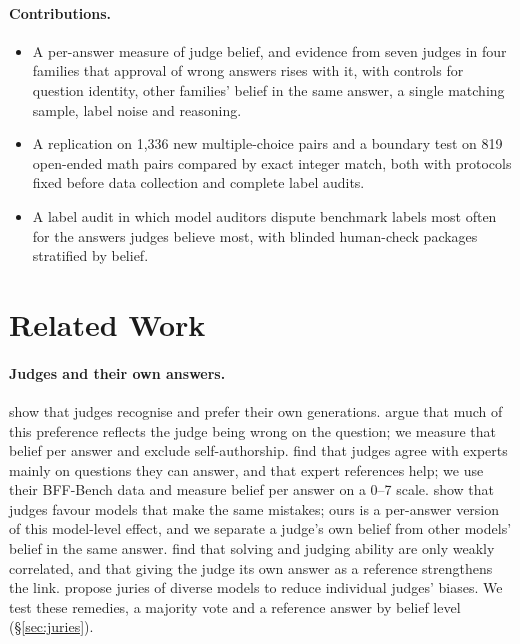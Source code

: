 \documentclass[11pt]{article}
\begin{document}
\paragraph{Contributions.}
\begin{itemize}
\item A per-answer measure of judge belief, and evidence from seven judges in four families that approval of wrong
answers rises with it, with controls for question identity, other families' belief in the same answer, a single
matching sample, label noise and reasoning.
\item A replication on 1,336 new multiple-choice pairs and a boundary test on 819 open-ended math pairs compared by
exact integer match, both with protocols fixed before data collection and complete label audits.
\item A label audit in which model auditors dispute benchmark labels most often for the answers judges believe
most, with blinded human-check packages stratified by belief.
\end{itemize}

\section{Related Work}

\paragraph{Judges and their own answers.}
\citet{panickssery2024llm} show that judges recognise and prefer their own generations.
\citet{roytburg2026narcissists} argue that much of this preference reflects the judge being wrong on the question;
we measure that belief per answer and exclude self-authorship. \citet{krumdick2026nofreelabels} find that judges
agree with experts mainly on questions they can answer, and that expert references help; we use their BFF-Bench data
and measure belief per answer on a 0--7 scale. \citet{goel2025great} show that judges favour models that make the same
mistakes; ours is a per-answer version of this model-level effect, and we separate a judge's own belief from other
models' belief in the same answer. \citet{lin-etal-2025-before} find that solving and
judging ability are only weakly correlated, and that giving the judge its own answer as a reference strengthens the
link. \citet{verga2024replacing} propose juries of diverse models to reduce individual judges' biases. We test these remedies, a majority vote and a
reference answer by belief level (\S\ref{sec:juries}).
\end{document}

